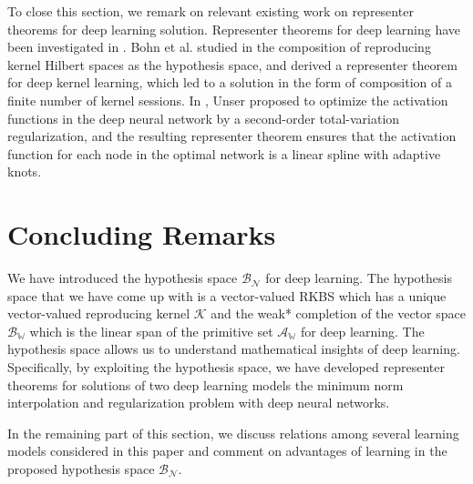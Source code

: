 \documentclass[11pt]{article}
\begin{document}
%
%

To close this section, we remark on relevant existing work on representer theorems for deep learning solution.
Representer theorems for deep learning have been investigated in \cite{bohn2019representer, unser2019representer}. 
Bohn et al. studied in \cite{bohn2019representer} the composition of reproducing kernel Hilbert spaces as the hypothesis space, and derived a representer theorem for deep kernel learning, which led to a solution in the form of composition of a finite number of kernel sessions. In \cite{unser2019representer}, Unser proposed to optimize the activation functions in the deep neural network by a second-order total-variation regularization, and the resulting representer theorem ensures that the activation function for each node in the optimal network is a linear spline with adaptive knots. 


%

%



 



 








\section{Concluding Remarks}
We have introduced the hypothesis
space $\mathcal{B}_{\mathcal{N}}$  for deep learning. The hypothesis space that we have come up with is a vector-valued RKBS which has a unique vector-valued reproducing kernel $\mathcal{K}$ and the weak* completion of the vector space $\mathcal{B}_{\mathbb{W}}$ which is the linear span of the primitive set $\mathcal{A}_{\mathbb{W}}$ for deep learning. The hypothesis space allows us to understand mathematical insights of deep learning. Specifically, by exploiting the hypothesis space, we have developed representer theorems for solutions of two deep learning models the minimum norm interpolation and regularization problem with deep neural networks.


In the remaining part of this section, we discuss  relations among several learning models considered in this paper and comment on advantages of learning in the proposed hypothesis space $\mathcal{B}_{\mathcal{N}}$.
\end{document}
